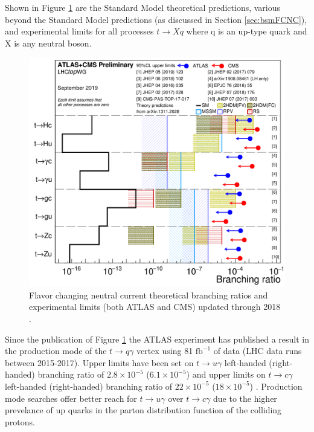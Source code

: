 Shown in Figure \ref{fig:FCNClimits} are the Standard Model theoretical predictions, various beyond the Standard Model predictions (as discussed in Section \ref{sec:bsmFCNC}), and experimental limits for all processes $t\rightarrow Xq$ where q is an up-type quark and X is any neutral boson.  
\begin{figure}[h!]
	\centering
	\includegraphics[width=.9\columnwidth]{../ThesisImages/Theory/AllFCNCLimits.png}
	\caption[Flavor changing neutral current theoretical branching ratios and experimental limits (both ATLAS and CMS) updated through 2018. ]{Flavor changing neutral current theoretical branching ratios and experimental limits (both ATLAS and CMS) updated through 2018 \cite{TopWG}. }
	\label{fig:FCNClimits}
\end{figure}

Since the publication of Figure \ref{fig:FCNClimits} the ATLAS experiment has published a result in the production mode of the $t\rightarrow q\gamma$ vertex using 81 $\text{fb}^{-1}$ of data (LHC data runs between 2015-2017).  Upper limits have been set on $t\rightarrow u \gamma$ left-handed (right-handed) branching ratio of $2.8\times 10^{-5}$ ($6.1\times 10^{-5}$) and upper limits on $t \rightarrow c \gamma$ left-handed (right-handed) branching ratio of $22\times10^{-5}$ ($18\times10^{-5}$) \cite{GregorFCNC}.  Production mode searches offer better reach for $t\rightarrow u \gamma$ over $t\rightarrow c \gamma$ due to the higher prevelance of up quarks in the parton distribution function of the colliding protons.

